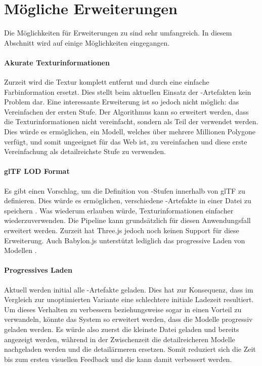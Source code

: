 \section{Mögliche Erweiterungen}
Die Möglichkeiten für Erweiterungen zu  sind sehr umfangreich. In diesem Abschnitt wird auf einige Möglichkeiten eingegangen.

\paragraph{Akurate Texturinformationen}
Zurzeit wird die Textur komplett entfernt und durch eine einfache Farbinformation ersetzt. Dies stellt beim aktuellen Einsatz der -Artefakten kein Problem dar. Eine interessante Erweiterung ist so jedoch nicht möglich: das Vereinfachen der ersten Stufe. Der Algorithmus kann so erweitert werden, dass die Texturinformationen nicht vereinfacht, sondern als Teil der  verwendet werden. Dies würde es ermöglichen, ein Modell, welches über mehrere Millionen Polygone verfügt, und somit ungeeignet für das Web ist, zu vereinfachen und diese erste Vereinfachung als detailreichste Stufe zu verwenden.

\paragraph{glTF LOD Format}
Es gibt einen Vorschlag, um die Definition von -Stufen innerhalb von glTF zu definieren. Dies würde es ermöglichen, verschiedene -Artefakte in einer Datei zu speichern \cite{glTFExtensionLOD}. Was wiederum erlauben würde, Texturinformationen einfacher wiederzuverwenden. Die Pipeline kann grundsätzlich für diesen Anwendungsfall erweitert werden.
Zurzeit hat Three.js jedoch noch keinen Support für diese Erweiterung. Auch Babylon.js unterstützt lediglich das progressive Laden von Modellen \cite{babylonProgressiveLoading}.

\paragraph{Progressives Laden}
Aktuell werden initial alle -Artefakte geladen. Dies hat zur Konsequenz, dass im Vergleich zur unoptimierten Variante eine schlechtere initiale Ladezeit resultiert. Um dieses Verhalten zu verbessern beziehungsweise sogar in einen Vorteil zu verwandeln, könnte das System so erweitert werden, dass die Modelle progressiv geladen werden. Es würde also zuerst die kleinste Datei geladen und bereits angezeigt werden, während in der Zwischenzeit die detailreicheren Modelle nachgeladen werden und die detailärmeren ersetzen. Somit reduziert sich die Zeit bis zum ersten visuellen Feedback und die  kann damit verbessert werden.

